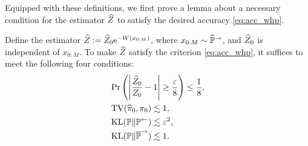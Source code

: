 Equipped with these definitions, we first prove a lemma about a necessary condition for the estimator $\widehat{Z}$ to satisfy the desired accuracy \cref{eq:acc_whp}.
\begin{lemma}
    \label{lem:disc_fram}
    Define the estimator $\widehat{Z}:=\widehat{Z}_0\mathrm{e}^{-W(x_{0:M})}$, where $x_{0:M}\sim\widehat{\mathbb{P}}^\to$, and $\widehat{Z}_0$ is independent of $x_{0:M}$. To make $\widehat{Z}$ satisfy the criterion \cref{eq:acc_whp}, it suffices to meet the following four conditions:
    \begin{align}
         & \operatorname{Pr}\left(\left|\frac{\widehat{Z}_0}{Z_0}-1\right|\ge\frac{\varepsilon}{8}\right)\le\frac{1}{8}\label{eq:ais_main_z0}, \\
         & \operatorname{TV}(\widehat{\pi}_0,\pi_0)\lesssim1,\label{eq:ais_main_pi0}                                           \\
         & \operatorname{KL}(\mathbb{P}\|\mathbb{P}^\gets)\lesssim\varepsilon^2\label{eq:ais_main_p_pl},                                    \\
         & \operatorname{KL}(\mathbb{P}\|\overline{\mathbb{P}}^\to)\lesssim1.\label{eq:ais_main_p_ptr}
    \end{align}
\end{lemma}

